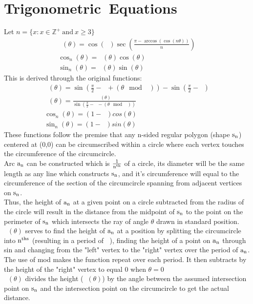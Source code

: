 \documentclass[11pt]{article}
\DeclareMathOperator{\custd}{\mathrm{d}_n}
\DeclareMathOperator{\custh}{\mathrm{h}_n}
\DeclareMathOperator{\period}{\frac{2\pi}{n}}
\DeclareMathOperator{\hp}{\frac{\pi}{n}}
\begin{document}
\section{Trigonometric\  Equations}
Let \(n=\{x:x\in\mathbb{Z}^+\ \mathrm{and}\ x\geq3\}\)
\begin{gather*}
   		\custd(\theta)=\cos(\hp)\sec(\frac{\pi - \arccos(\cos(n\theta))}{n})\\
   		\cos_n(\theta)=\custd(\theta)\cos(\theta)\\
   		\sin_n(\theta)=\custd(\theta)\sin(\theta)
\end{gather*}
This is derived through the original functions:
\begin{gather*}
   		\custh(\theta)=\sin(\frac{\pi}{2}-\hp+(\theta\mod\period))-\sin(\frac{\pi}{2}-\hp)\\
   		\custd(\theta)=\frac{\custh(\theta)}{\sin(\frac{\pi}{2}-\hp-(\theta\mod\period))}\\
   		\cos_n(\theta)=(1-\custd)cos(\theta)\\
   		\sin_n(\theta)=(1-\custd)sin(\theta)
\end{gather*}
These functions follow the premise that any n-sided regular polygon (shape \(\rm s_n\)) centered at (0,0) can be circumscribed within a circle where each vertex touches the circumference of the circumcircle. \\
Arc \(\rm a_n\) can be constructed which is \(\rm \frac{1}{n^{th}}\) of a circle, its diameter will be the same length as any line which constructs \(\rm s_n\), and it's circumference will equal to the circumference of the section of the circumcircle spanning from adjacent vertices on \(\rm s_n\). \\
Thus, the height of \(\rm a_n\) at a given point on a circle subtracted from the radius of the circle will result in the distance from the midpoint of \(\rm s_n\) to the point on the perimeter of \(\rm s_n\) which intersects the ray of angle \(\theta\) drawn in standard position.\\
\(\custh(\theta)\) serves to find the height of \(\rm a_n\) at a position by splitting the circumcircle into \(\rm n^{ths}\) (resulting in a period of \(\period\)), finding the height of a point on \(\rm a_n\) through sin and changing from the "left" vertex to the "right" vertex over the period of \(\rm a_n\). The use of mod makes the function repeat over each period. It then subtracts by the height of the "right" vertex to equal 0 when \(\theta=0\)\\
\(\custd(\theta)\) divides the height (\(\custh(\theta)\)) by the angle between the assumed intersection point on \(\rm s_n\) and the intersection point on the circumcircle to get the actual distance.\\
\end{document}
